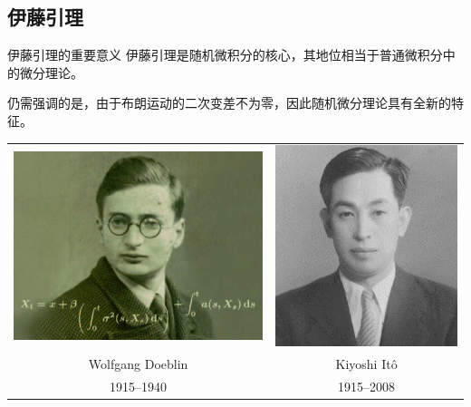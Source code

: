 \documentclass[t]{beamer}
\begin{document}
\subsection{伊藤引理}
\begin{frame}{伊藤引理的重要意义}
伊藤引理是随机微积分的核心，其地位相当于普通微积分中的微分理论。

仍需强调的是，由于布朗运动的二次变差不为零，因此随机微分理论具有全新的特征。
\begin{center}
\begin{tabular}{cc}
\includegraphics[height=.3\textheight]{fig/doeblin.jpg}& \includegraphics[height=.3\textheight]{fig/ito.jpg}\\
Wolfgang Doeblin& Kiyoshi It\^{o}\\
1915--1940 & 1915--2008
\end{tabular}
\end{center}
\end{frame}
\end{document}
